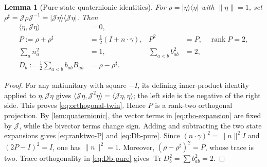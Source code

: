 \documentclass[11pt]{article}
\newtheorem{lemma}[lemma]{Lemma}
\theoremstyle{definition}
\theoremstyle{remark}
\newcommand{\Tr}{\operatorname{Tr}}
\newcommand{\rank}{\operatorname{rank}}
\newcommand{\norm}[1]{\lVert#1\rVert}
\newcommand{\ip}[2]{\langle#1,#2\rangle}
\newcommand{\ketbra}[1]{|#1\rangle\langle#1|}
\newcommand{\Jq}{\mathcal J}
\begin{document}
\begin{lemma}[Pure-state quaternionic identities]
\label{lem:pure-identities}
For $\rho=\ketbra{\eta}$ with $\norm\eta=1$, set
$\rho^\sharp=\Jq\rho\Jq^{-1}=\ketbra{\Jq\eta}$. Then
\begin{align}
 \ip{\eta}{\Jq\eta}&=0,\label{eq:orthogonal-twin}\\
 P:=\rho+\rho^\sharp&=\frac12(I+n\cdot\gamma),
 &P^2&=P,\quad \rank P=2,\label{eq:ranktwo-P}\\
 \sum_a n_a^2&=1,
 &\sum_{a<b}b_{ab}^2&=2,\label{eq:pure-sums}\\
 D_b:=\frac12\sum_{a<b}b_{ab}B_{ab}&=\rho-\rho^\sharp.
 \label{eq:Db-pure}
\end{align}
\end{lemma}
\begin{proof}
For any antiunitary with square $-I$, its defining inner-product identity
applied to $\eta,\Jq\eta$ gives
$\ip{\Jq\eta}{\Jq^2\eta}=\ip{\Jq\eta}{\eta}$; the left side is the negative
of the right side. This proves \eqref{eq:orthogonal-twin}. Hence $P$ is a
rank-two orthogonal projection. By \cref{lem:quaternionic}, the vector terms
in \eqref{eq:rho-expansion} are fixed by $\Jq$, while the bivector terms change
sign. Adding and subtracting the two state expansions gives
\eqref{eq:ranktwo-P} and \eqref{eq:Db-pure}. Since
$(n\cdot\gamma)^2=\norm n^2 I$ and $(2P-I)^2=I$, one has $\norm n^2=1$.
Moreover, $(\rho-\rho^\sharp)^2=P$, whose trace is two. Trace orthogonality
in \eqref{eq:Db-pure} gives $\Tr D_b^2=\sum b_{ab}^2=2$.
\end{proof}
\end{document}
